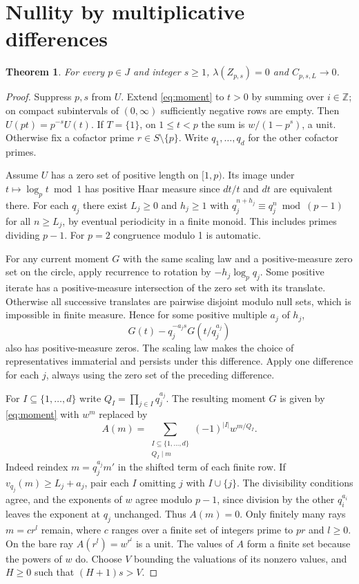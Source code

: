 \documentclass[11pt]{article}
\newtheorem{theorem}{Theorem}[section]
\newcommand{\Z}{\mathbb Z}
\newcommand{\Q}{\mathbb Q}
\newcommand{\vol}{\lambda}
\begin{document}
\section{Nullity by multiplicative differences}
\begin{theorem}\label{thm:null}
For every \(p\in J\) and integer \(s\ge1\), \(\vol(Z_{p,s})=0\) and \(C_{p,s,L}\to0\).
\end{theorem}
\begin{proof}
Suppress \(p,s\) from \(U\). Extend \eqref{eq:moment} to \(t>0\) by summing over \(i\in\Z\); on compact subintervals of \((0,\infty)\) sufficiently negative rows are empty. Then \(U(pt)=p^{-s}U(t)\). If \(T=\{1\}\), on \(1\le t<p\) the sum is \(w/(1-p^s)\), a unit. Otherwise fix a cofactor prime \(r\in S\setminus\{p\}\). Write \(q_1,\ldots,q_d\) for the other cofactor primes.

Assume \(U\) has a zero set of positive length on \([1,p)\). Its image under \(t\mapsto\log_p t\bmod1\) has positive Haar measure since \(dt/t\) and \(dt\) are equivalent there. For each \(q_j\) there exist \(L_j\ge0\) and \(h_j\ge1\) with \(q_j^{n+h_j}\equiv q_j^n\bmod(p-1)\) for all \(n\ge L_j\), by eventual periodicity in a finite monoid. This includes primes dividing \(p-1\). For \(p=2\) congruence modulo 1 is automatic.

For any current moment \(G\) with the same scaling law and a positive-measure zero set on the circle, apply recurrence to rotation by \(-h_j\log_p q_j\). Some positive iterate has a positive-measure intersection of the zero set with its translate. Otherwise all successive translates are pairwise disjoint modulo null sets, which is impossible in finite measure. Hence for some positive multiple \(a_j\) of \(h_j\),
\[
 G(t)-q_j^{-a_j s}G(t/q_j^{a_j})
\]
also has positive-measure zeros. The scaling law makes the choice of representatives immaterial and persists under this difference. Apply one difference for each \(j\), always using the zero set of the preceding difference.

For \(I\subseteq\{1,\ldots,d\}\) write \(Q_I=\prod_{j\in I}q_j^{a_j}\). The resulting moment \(G\) is given by \eqref{eq:moment} with \(w^m\) replaced by
\[
 A(m)=\sum_{\substack{I\subseteq\{1,\ldots,d\}\\Q_I\mid m}}(-1)^{|I|}w^{m/Q_I}.
\]
Indeed reindex \(m=q_j^{a_j}m'\) in the shifted term of each finite row. If \(v_{q_j}(m)\ge L_j+a_j\), pair each \(I\) omitting \(j\) with \(I\cup\{j\}\). The divisibility conditions agree, and the exponents of \(w\) agree modulo \(p-1\), since division by the other \(q_i^{a_i}\) leaves the exponent at \(q_j\) unchanged. Thus \(A(m)=0\). Only finitely many rays \(m=c r^l\) remain, where \(c\) ranges over a finite set of integers prime to \(pr\) and \(l\ge0\). On the bare ray \(A(r^l)=w^{r^l}\) is a unit. The values of \(A\) form a finite set because the powers of \(w\) do. Choose \(V\) bounding the valuations of its nonzero values, and \(H\ge0\) such that \((H+1)s>V\).


\end{proof}
\end{document}
